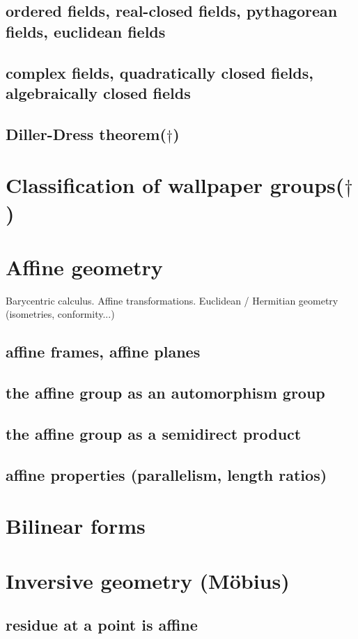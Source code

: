\documentclass[a4,12pt]{amsbook}
\begin{document}
\section{ordered fields, real-closed fields, pythagorean fields, euclidean fields}
\section{complex fields, quadratically closed fields, algebraically closed fields}
\section{Diller-Dress theorem($\dagger$)}
\chapter{Classification of wallpaper groups($\dagger$)}
\chapter{Affine geometry}
Barycentric calculus. Affine transformations. Euclidean / Hermitian geometry (isometries, conformity...)
\section{affine frames, affine planes}
\section{the affine group as an automorphism group}
\section{the affine group as a semidirect product}
\section{affine properties (parallelism, length ratios)}
\chapter{Bilinear forms}
\chapter{Inversive geometry (Möbius)}
\section{residue at a point is affine}
\end{document}
